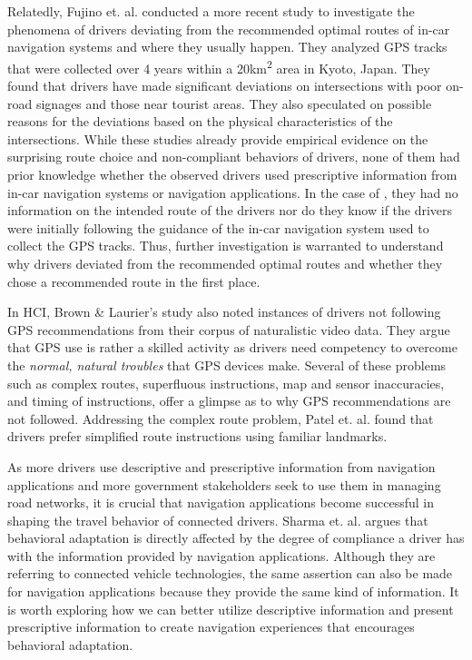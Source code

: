 Relatedly, Fujino et. al. \cite{Fujino2018DetectingTracks} conducted a more recent study to investigate the phenomena of drivers deviating from the recommended optimal routes of in-car navigation systems and where they usually happen. They analyzed GPS tracks that were collected over 4 years within a 20km\textsuperscript{2} area in Kyoto, Japan. They found that drivers have made significant deviations on intersections with poor on-road signages and those near tourist areas. They also speculated on possible reasons for the deviations based on the physical characteristics of the intersections. While these studies already provide empirical evidence on the surprising route choice and non-compliant behaviors of drivers, none of them had prior knowledge whether the observed drivers used prescriptive information from in-car navigation systems or navigation applications. In the case of \cite{Zhu2015DoPrinciple, Tang2016AnalyzingData, Fujino2018DetectingTracks}, they had no information on the intended route of the drivers nor do they know if the drivers were initially following the guidance of the in-car navigation system used to collect the GPS tracks. Thus, further investigation is warranted to understand why drivers deviated from the recommended optimal routes and whether they chose a recommended route in the first place.

In HCI, Brown \& Laurier's study \cite{Brown2012TheGPS} also noted instances of drivers not following GPS recommendations from their corpus of naturalistic video data. They argue that GPS use is rather a skilled activity as drivers need competency to overcome the \emph{normal, natural troubles} that GPS devices make. Several of these problems such as complex routes, superfluous instructions, map and sensor inaccuracies, and timing of instructions, offer a glimpse as to why GPS recommendations are not followed. Addressing the complex route problem, Patel et. al. \cite{Patel2006PersonalizingRoutes} found that drivers prefer simplified route instructions using familiar landmarks.

As more drivers use descriptive and prescriptive information from navigation applications and more government stakeholders seek to use them in managing road networks, it is crucial that navigation applications become successful in shaping the travel behavior of connected drivers. Sharma et. al. \cite{Ali2018} argues that behavioral adaptation is directly affected by the degree of compliance a driver has with the information provided by navigation applications. Although they are referring to connected vehicle technologies, the same assertion can also be made for navigation applications because they provide the same kind of information. It is worth exploring how we can better utilize descriptive information and present prescriptive information to create navigation experiences that encourages behavioral adaptation.

